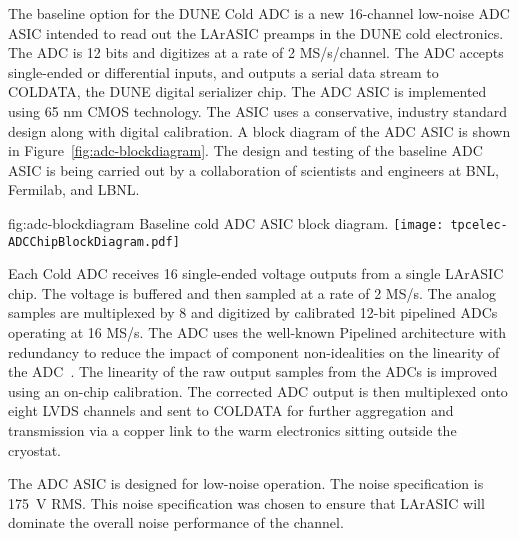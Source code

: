 The baseline option for the DUNE Cold ADC is a new 16-channel low-noise ADC ASIC intended to read out the LArASIC preamps in the DUNE cold electronics. The ADC is 12 bits and digitizes at a rate of 2 MS/s/channel. The ADC accepts single-ended or differential inputs, and outputs a serial data stream to COLDATA, the DUNE digital serializer chip. The ADC ASIC is implemented using 65 nm CMOS technology. The ASIC uses a conservative, industry standard design along with digital calibration. A block diagram of the ADC ASIC is shown in Figure~\ref{fig:adc-blockdiagram}. The design and testing of the baseline ADC ASIC is being carried out by a collaboration of scientists and engineers at BNL, Fermilab, and LBNL.

\begin{dunefigure}
{fig:adc-blockdiagram}
{Baseline cold ADC ASIC block diagram.}
\texttt{[image: tpcelec-ADCChipBlockDiagram.pdf]}
\end{dunefigure}

Each Cold ADC receives 16 single-ended voltage outputs from a single LArASIC chip. The voltage is buffered and then sampled at a rate of 2 MS/s. The analog samples are multiplexed by 8 and digitized by calibrated 12-bit pipelined ADCs operating at 16 MS/s. The ADC uses the well-known Pipelined architecture with redundancy to reduce the impact of component non-idealities on the linearity of the ADC~\cite{121557}. The linearity of the raw output samples from the ADCs is improved using an on-chip calibration. The corrected ADC output is then multiplexed onto eight LVDS channels and sent to COLDATA for further aggregation and transmission via a copper link to the warm electronics sitting outside the cryostat.

The ADC ASIC is designed for low-noise operation. The noise specification is 175~\si{\micro}V RMS. This noise specification was chosen to ensure that LArASIC will dominate the overall noise performance of the channel.

